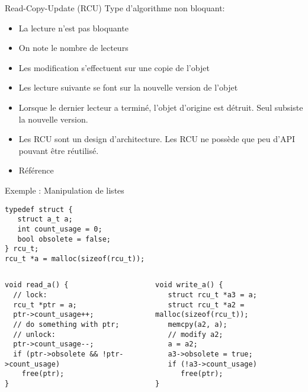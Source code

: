 
\begin{frame}[fragile=singleslide]{Read-Copy-Update (RCU)}
  Type d'algorithme non bloquant:
  \begin{itemize} 
  \item La lecture n'est pas bloquante
  \item On note le nombre de lecteurs
  \item Les modification s'effectuent sur une copie de l'objet
  \item Les lecture suivante se font sur la nouvelle version de l'objet
  \item Lorsque  le dernier lecteur  a terminé, l'objet  d'origine est
    détruit. Seul subsiste la nouvelle version.
  \item  Les RCU sont un design d'architecture. Les RCU ne possède que peu d'API pouvant être réutilisé.
  \item Référence   
  \end{itemize} 
\end{frame}

\begin{frame}[fragile]{Exemple : Manipulation de listes} 
  \begin{center}
    \begin{lstlisting}[basicstyle=\ttfamily\scriptsize\color{colBasic},commentstyle=\scriptsize\itshape\color{colComments},numbers=none]
typedef struct {
   struct a_t a;
   int count_usage = 0;
   bool obsolete = false;
} rcu_t;
rcu_t *a = malloc(sizeof(rcu_t)); 
    \end{lstlisting}
  \end{center}
  \begin{columns}
    \begin{column}{5cm}
      \begin{lstlisting}[basicstyle=\ttfamily\scriptsize\color{colBasic},commentstyle=\scriptsize\itshape\color{colComments},numbers=none]
void read_a() {
  // lock:
  rcu_t *ptr = a;
  ptr->count_usage++;
  // do something with ptr;
  // unlock:
  ptr->count_usage--;
  if (ptr->obsolete && !ptr->count_usage)
    free(ptr);
}
      \end{lstlisting}
    \end{column}
    \begin{column}{5cm}
      \begin{lstlisting}[basicstyle=\ttfamily\scriptsize\color{colBasic},commentstyle=\scriptsize\itshape\color{colComments},numbers=none]
void write_a() { 
   struct rcu_t *a3 = a;
   struct rcu_t *a2 = malloc(sizeof(rcu_t));
   memcpy(a2, a);
   // modify a2;   
   a = a2;  
   a3->obsolete = true;
   if (!a3->count_usage)
      free(ptr);
}
      \end{lstlisting} 
    \end{column}
  \end{columns}
\end{frame} 

